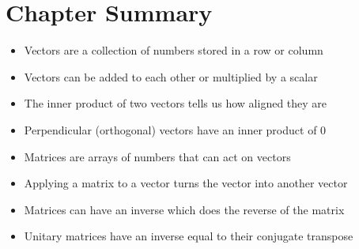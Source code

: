 \section{Chapter Summary }

\begin{itemize} 
    \item Vectors are a collection of numbers stored in a row or column
    \item Vectors can be added to each other or multiplied by a scalar
    \item The inner product of two vectors tells us how aligned they are
    \item  Perpendicular (orthogonal) vectors have an inner product of 0
    \item  Matrices are arrays of numbers that can act on vectors 
    \item  Applying a matrix to a vector turns the vector into another vector
    \item  Matrices can have an inverse which does the reverse of the matrix 
    \item  Unitary matrices have an inverse equal to their conjugate transpose
\end{itemize}